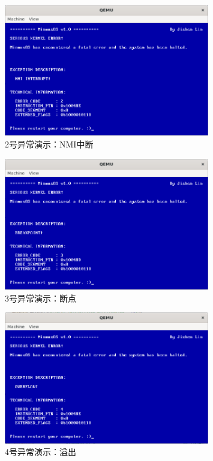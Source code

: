 \begin{figure}[htbp]
    \centering
    \includegraphics[width=0.8\textwidth]{figures/Exception2Presentation.png}
    \caption{2号异常演示：NMI中断}
\end{figure}

\begin{figure}[htbp]
    \centering
    \includegraphics[width=0.8\textwidth]{figures/Exception3Presentation.png}
    \caption{3号异常演示：断点}
\end{figure}

\begin{figure}[htbp]
    \centering
    \includegraphics[width=0.8\textwidth]{figures/Exception4Presentation.png}
    \caption{4号异常演示：溢出}
\end{figure}

